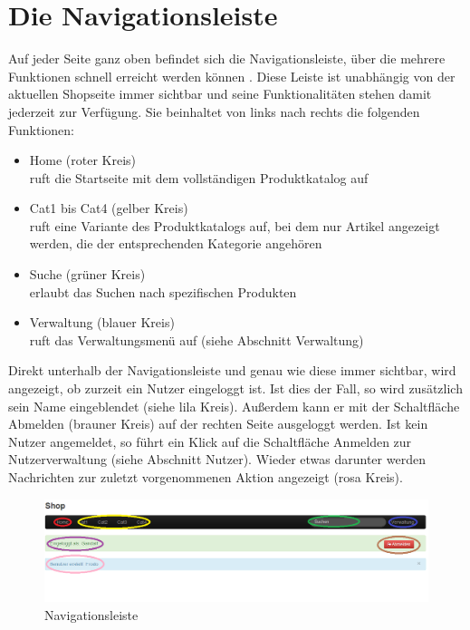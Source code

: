\section{Die Navigationsleiste}
Auf jeder Seite ganz oben befindet sich die Navigationsleiste, über die mehrere Funktionen schnell erreicht werden können . Diese Leiste ist unabhängig von der aktuellen Shopseite immer sichtbar und seine Funktionalitäten stehen damit jederzeit zur Ver\-fü\-gung. Sie beinhaltet von links nach rechts die folgenden Funktionen:
\begin{itemize}
  \item Home (roter Kreis) \\
        ruft die Startseite mit dem vollständigen Produktkatalog auf
  \vspace*{-0.5em}
  \item Cat1 bis Cat4 (gelber Kreis) \\
        ruft eine Variante des Produktkatalogs auf, bei dem nur Artikel angezeigt werden, die der entsprechenden Kategorie angehören        
  \vspace*{-0.5em}
  \item Suche (grüner Kreis) \\
        erlaubt das Suchen nach spezifischen Produkten
  \vspace*{-0.5em}
  \item Verwaltung (blauer Kreis) \\
        ruft das Verwaltungsmenü auf (siehe Abschnitt Verwaltung)
\end{itemize}
Direkt unterhalb der Navigationsleiste und genau wie diese immer sichtbar, wird angezeigt, ob zurzeit ein Nutzer eingeloggt ist. Ist dies der Fall, so wird zusätzlich sein Name eingeblendet  (siehe lila Kreis). Außerdem  kann er mit der Schaltfläche Abmelden (brauner Kreis) auf der rechten Seite ausgeloggt werden.  Ist kein Nutzer angemeldet, so führt ein Klick auf die Schaltfläche Anmelden zur Nutzerverwaltung (siehe Abschnitt Nutzer). 
Wieder etwas darunter werden Nachrichten zur zuletzt vorgenommenen Aktion angezeigt (rosa Kreis).

\begin{figure}[h!]
  \centering
  \includegraphics[width=\textwidth]{img/Navi.png}
  \caption{Navigationsleiste}
  \label{fig:Navigationsleiste}
\end{figure}


